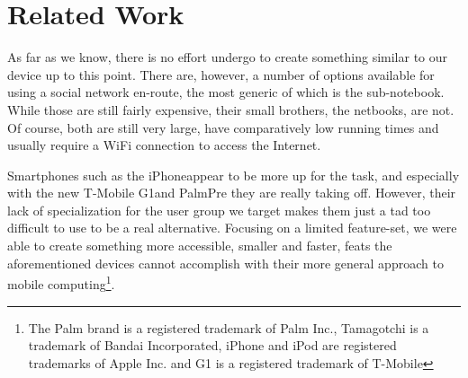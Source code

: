 %
%
%
\section{Related Work}
As far as we know, there is no effort undergo to create something similar to our device up to this point. There are,
however, a number of options available for using a social network en-route, the most generic of which is the 
sub-notebook. While those are still fairly expensive, their small brothers, the netbooks, are not. Of course,
both are still very large, have comparatively low running times and usually require a WiFi connection to 
access the Internet. 

Smartphones such as the iPhone\registered appear to be more up for the task, and especially 
with the new T-Mobile G1\registered and 
Palm\registered Pre they are really taking off. However, their lack of specialization for the user 
group we target makes them just a tad too difficult to use to be a real alternative. 
Focusing on a limited feature-set, we were able to create something more accessible, smaller and 
faster, feats the aforementioned devices cannot accomplish with their more general approach to 
mobile computing\footnote{The Palm brand is a registered trademark of Palm Inc., Tamagotchi is a 
trademark of Bandai Incorporated, iPhone and iPod are registered trademarks of Apple Inc. and 
G1 is a registered trademark of T-Mobile}.
